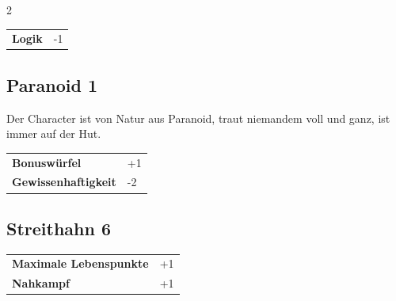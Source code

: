 \begin{multicols}{2}
\begin{tcolorbox}
\begin{tabular}{@{}ll@{}}
    \textbf{Logik} & -1\\
\end{tabular}


\end{tcolorbox}

\begin{tcolorbox}
    \subsection*{Paranoid \hfill \small{1 }}
    \tcblower
Der Character ist von Natur aus Paranoid, traut niemandem voll und ganz, ist immer auf der Hut.


\vspace{3mm}

\begin{tabular}{@{}ll@{}}
    \textbf{Bonuswürfel} & +1\\
    \textbf{Gewissenhaftigkeit} & -2\\
\end{tabular}


\end{tcolorbox}

\begin{tcolorbox}
    \subsection*{Streithahn \hfill \small{6 }}
    \tcblower




\begin{tabular}{@{}ll@{}}
    \textbf{Maximale Lebenspunkte} & +1\\
    \textbf{Nahkampf} & +1\\
\end{tabular}


\end{tcolorbox}


\end{multicols}
